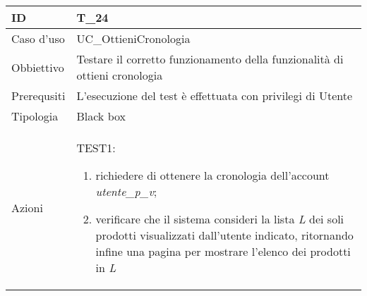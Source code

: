 \begin{table}[hb]
    \centering
    \begin{tabular}{ |p{2cm}|p{10cm}|  }
        \hline
        ID          & T\_24                                                                      \\\hline
        Caso d'uso  & UC\_OttieniCronologia                                                      \\\hline
        Obbiettivo  & Testare il corretto funzionamento della funzionalità di ottieni cronologia \\\hline
        Prerequsiti & L'esecuzione del test è effettuata con privilegi di Utente                 \\\hline
        Tipologia   & Black box                                                                  \\\hline
        Azioni      &
        TEST1:
        \begin{enumerate}[nosep, topsep=0pt]
            \item richiedere di ottenere la cronologia dell'account \emph{utente\_p\_v};
            \item verificare che il sistema consideri la lista \emph{L} dei soli prodotti visualizzati dall'utente indicato, ritornando infine una pagina per mostrare l'elenco dei prodotti in \emph{L}
        \end{enumerate}
        \\\hline
    \end{tabular}
\end{table}

